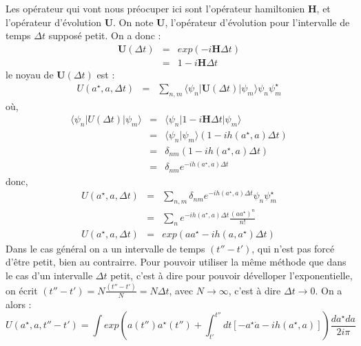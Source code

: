 \documentclass[a4paper,11pt]{article}
\theoremstyle{plain}
\theoremstyle{definition}
\theoremstyle{remark}
\numberwithin{equation}{section}
\numberwithin{equation}{subsection}
\numberwithin{figure}{section}
\begin{document}
\noindent
Les opérateur qui vont nous préocuper ici sont l'opérateur hamiltonien $\textbf{H}$, et l'opérateur d'évolution $\textbf{U}$. On 
note $\textbf{U}$, l'opérateur d'évolution pour l'intervalle de temps $\Delta t$ supposé petit. On a donc :
\begin{eqnarray}
 \textbf{U}(\Delta t) &=& exp( -i \textbf{H} \Delta t )\\
             &=& 1 - i \textbf{H} \Delta t
\end{eqnarray}
le noyau de $\textbf{U}(\Delta t)$ est :
\begin{eqnarray}
 U(a^{\star} , a, \Delta t) &=& \sum_{n,m} \langle \psi_{n} | \textbf{U}(\Delta t) | \psi_{m} \rangle  \psi_{n} \psi_{m}^{\star}
\end{eqnarray}
où,
\begin{eqnarray}
 \langle \psi_{n} | U(\Delta t) | \psi_{m} \rangle &=& \langle \psi_{n} | 1 - i \textbf{H} \Delta t | \psi_{m} \rangle \\
                                                   &=& \langle \psi_{n} | \psi_{m} \rangle \left( 1 - i h(a^{\star},a) \Delta t \right) \\
                                                   &=& \delta_{nm} \left( 1 - i h(a^{\star},a) \Delta t \right) \\
                                                   &=&  \delta_{nm} e^{-i h (a^{\star},a) \Delta t}
\end{eqnarray}
donc, 
\begin{eqnarray}
 U(a^{\star} , a, \Delta t) &=& \sum_{n, m} \delta_{nm} e^{-i h (a^{\star},a) \Delta t} \psi_{n} \psi_{m}^{\star} \\
                            &=& \sum_{n} e^{-i h (a^{\star},a) \Delta t} \frac{\left(a a^{\star}\right)^{n}}{n !}\\
 U(a^{\star} , a, \Delta t) &=& exp\left(a a^{\star} - i h(a , a^{\star}) \Delta t \right) 
\end{eqnarray}
Dans le cas général on a un intervalle de temps $(t''-t')$, qui n'est pas forcé d'être petit, bien au contrairre. Pour pouvoir 
utiliser la même méthode que dans le cas d'un  intervalle $\Delta t$ petit, c'est à dire pour pouvoir dévelloper l'exponentielle, 
on écrit $ (t''-t') = N \frac{(t''-t')}{N} = N \Delta t$, avec $N \rightarrow \infty$, c'est à dire $\Delta t \rightarrow 0$. On a alors :
\begin{equation}
  U(a^{\star} , a, t''-t') = \int exp \left( a(t'') a^{\star}(t'') 
+ \int_{t'}^{t''} dt \left[ -a^{\star} \dot{a} - i h(a^{\star},a) \right] \right) \frac{da^{\star} da}{2i \pi}
\end{equation}
\end{document}
